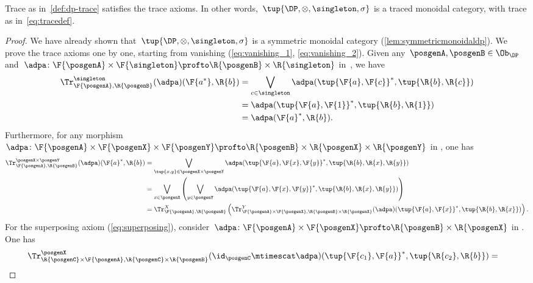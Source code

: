 \begin{lemma}
  Trace as in~\cref{def:dp-trace} satisfies the trace axioms. In other words,~$\tup{\DP, \otimes, \singleton, \sigma}$ is a traced monoidal category, with trace as in~\cref{eq:tracedef}.
\end{lemma}
\begin{proof}
  We have already shown that~$\tup{\DP,\otimes,\singleton,\sigma}$ is a symmetric monoidal category (\cref{lem:symmetricmonoidaldp}).
  We prove the trace axioms one by one, starting from vanishing (\cref{eq:vanishing_1}, \cref{eq:vanishing_2}).
  Given any~$\posgenA,\posgenB\in \Ob_\DP$ and~$\adpa\colon \F{\posgenA}\times \F{\singleton}\profto \R{\posgenB}\times \R{\singleton}$ in~\DP, we have
  \begin{equation}
    \begin{aligned}
      \Tr_{\F{\posgenA},\R{\posgenB}}^{\singleton}(\adpa)(\F{a^*},\R{b})&=\bigvee_{c\in \singleton}\adpa(\tup{\F{a},\F{c}}^*,\tup{\R{b},\R{c}})\\
      &=\adpa(\tup{\F{a},\F{1}}^*,\tup{\R{b},\R{1}})\\
      &=\adpa(\F{a}^*,\R{b}).
    \end{aligned}
  \end{equation}
  Furthermore, for any morphism~$\adpa\colon \F{\posgenA}\times \F{\posgenX}\times \F{\posgenY} \profto \R{\posgenB}\times \R{\posgenX} \times \R{\posgenY}$ in \DP, one has
  \begin{equation}
    \begin{aligned}
      \Tr_{\F{\posgenA},\R{\posgenB}}^{\posgenX\times \posgenY}(\adpa)(\F{a}^*,\R{b})&=\bigvee_{\tup{x,y} \in \posgenX\times \posgenY} \adpa(\tup{\F{a},\F{x},\F{y}}^*,\tup{\R{b},\R{x},\R{y}})\\
      &=\bigvee_{x \in \posgenX}\left(\bigvee_{y \in \posgenY} \adpa(\tup{\F{a},\F{x},\F{y}}^*,\tup{\R{b},\R{x},\R{y}})\right)\\
      &=\Tr_{\F{\posgenA},\R{\posgenB}}^X\left(
      \Tr_{\F{\posgenA}\times \F{\posgenX},\R{\posgenB}\times \R{\posgenX}}^Y(\adpa)(\tup{\F{a},\F{x}}^*,\tup{\R{b},\R{x}})\right).
    \end{aligned}
  \end{equation}
  For the superposing axiom (\cref{eq:superposing}), consider~$\adpa\colon \F{\posgenA}\times \F{\posgenX}\profto \R{\posgenB}\times \R{\posgenX}$ in \DP.
  One has
  \begin{equation}
    \begin{aligned}
      \Tr_{\R{\posgenC}\times \F{\posgenA},\R{\posgenC}\times \R{\posgenB}}^{\posgenX}(\id_\posgenC\mtimescat \adpa)(\tup{\F{c_1},\F{a}}^*,\tup{\R{c_2},\R{b}})&=

\end{aligned}
\end{equation}
\end{proof}
